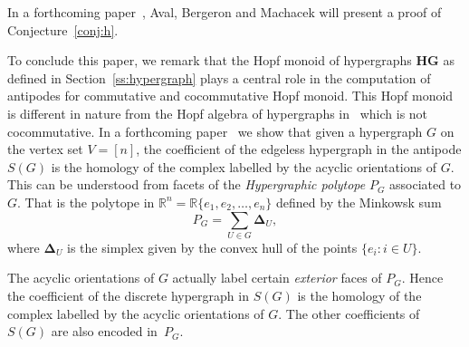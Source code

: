 \documentclass[ALCO,ThmDefs,Unicode,epreuves]{cedram}
\begin{document}
\noindent
In a forthcoming paper~\cite{BA:2018}, Aval, Bergeron and Machacek will present a proof of Conjecture~\ref{conj:h}.

%
%
% 
%


To conclude this paper, we remark that the Hopf monoid of hypergraphs $\mathbf{HG}$ as defined in Section~\ref{ss:hypergraph} plays a central
role in the computation of antipodes for commutative and cocommutative Hopf monoid. 
This Hopf monoid is different in nature from the Hopf algebra of hypergraphs in~\cite{Aguiar-Ardila} which is not cocommutative.
In a forthcoming paper~\cite{BBM:2017} we show that 
 given a hypergraph $G$ on the vertex set $V=[n]$, the coefficient of the edgeless hypergraph in the antipode $S(G)$
is the homology of the complex labelled by the acyclic orientations of $G$. This can be understood from facets of 
 the \emph{Hypergraphic polytope} $P_G$ associated to $G$. That is the polytope in ${\mathbb R}^n={\mathbb R}\{e_1,e_2,\ldots,e_n\}$
 defined by the Minkowsk sum
 $$P_G=\sum_{U\in G} \mathbf{\Delta}_U,$$
 where $\mathbf{\Delta}_U$ is the simplex given by the convex hull of the points $\{e_i : i\in U\}$.


The acyclic orientations of $G$ actually label certain \emph{exterior} faces of $P_G$. Hence the coefficient of the discrete hypergraph in $S(G)$
is the homology of the complex labelled by the acyclic orientations of $G$. The other coefficients of $S(G)$ are also encoded in~$P_G$.
\end{document}

